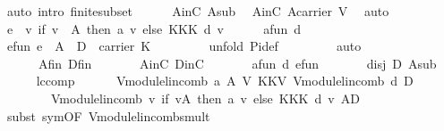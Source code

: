 \begin{isabellebody}
\ {\isacharparenleft}auto\ intro{\isacharcolon}\ finite{\isacharunderscore}subset{\isacharparenright}\isanewline
\ \ \ \ \isamarkupfalse%
\ AinC\ A{\isacharprime}sub\ \isamarkupfalse%
\ A{\isacharprime}inC{\isacharcolon}\ {\isachardoublequoteopen}A{\isacharprime}{\isasymsubseteq}carrier\ V{\isachardoublequoteclose}\ \isamarkupfalse%
\ auto\isanewline
\ \ \ \ \isamarkupfalse%
\ {\isacharquery}e\ {\isacharequal}\ {\isachardoublequoteopen}{\isacharparenleft}{\isasymlambda}v{\isachardot}\ if\ v\ {\isasymin}\ A{\isacharprime}\ then\ a{\isacharprime}\ v\ else\ {\isasymominus}\isactrlbsub K\isactrlesub {\isasymone}\isactrlbsub K\isactrlesub {\isasymotimes}\isactrlbsub K\isactrlesub \ d\ v{\isacharparenright}{\isachardoublequoteclose}\isanewline
\ \ \ \ \isamarkupfalse%
\ a{\isacharprime}fun\ d\ \isamarkupfalse%
\ e{\isacharunderscore}fun{\isacharcolon}\ {\isachardoublequoteopen}{\isacharquery}e\ {\isasymin}\ A{\isacharprime}\ {\isasymunion}\ D\ {\isasymrightarrow}\ carrier\ K{\isachardoublequoteclose}\ \isanewline
\ \ \ \ \ \ \isamarkupfalse%
\ {\isacharparenleft}unfold\ Pi{\isacharunderscore}def{\isacharparenright}\ \isanewline
\ \ \ \ \ \ \isamarkupfalse%
\ auto\isanewline
\ \ \ \ \isamarkupfalse%
\isanewline
\ \ \ \ \ \ A{\isacharprime}fin\ Dfin\ \isanewline
\ \ \ \ \ \ A{\isacharprime}inC\ DinC\ \isanewline
\ \ \ \ \ \ a{\isacharprime}fun\ d\ e{\isacharunderscore}fun\ \isanewline
\ \ \ \ \ \ disj\ D\ A{\isacharprime}sub\ \isanewline
\ \ \ \ \isamarkupfalse%
\ lccomp{}{\isacharcolon}\isanewline
\ \ \ \ \ \ {\isachardoublequoteopen}V{\isachardot}module{\isachardot}lincomb\ a{\isacharprime}\ A{\isacharprime}\ {\isasymoplus}\isactrlbsub V\isactrlesub \ {\isasymominus}\isactrlbsub K\isactrlesub {\isasymone}\isactrlbsub K\isactrlesub {\isasymodot}\isactrlbsub V\isactrlesub \ V{\isachardot}module{\isachardot}lincomb\ d\ D\ {\isacharequal}\ \isanewline
\ \ \ \ \ \ \ \ V{\isachardot}module{\isachardot}lincomb\ {\isacharparenleft}{\isasymlambda}v{\isachardot}\ if\ v{\isasymin}A{\isacharprime}\ then\ a{\isacharprime}\ v\ else\ {\isasymominus}\isactrlbsub K\isactrlesub {\isasymone}\isactrlbsub K\isactrlesub {\isasymotimes}\isactrlbsub K\isactrlesub \ d\ v{\isacharparenright}\ {\isacharparenleft}A{\isacharprime}{\isasymunion}D{\isacharparenright}{\isachardoublequoteclose}\isanewline
\ \ \ \ \ \ \isamarkupfalse%
\ {\isacharparenleft}subst\ sym{\isacharbrackleft}OF\ V{\isachardot}module{\isachardot}lincomb{\isacharunderscore}smult{\isacharbrackright}{\isacharparenright}\isanewline

\end{isabellebody}
